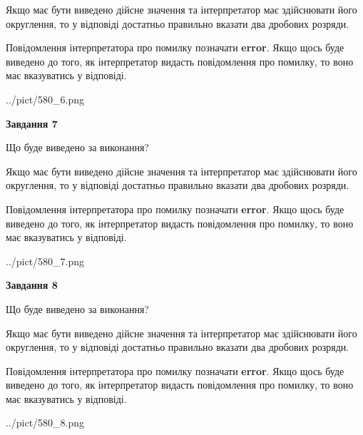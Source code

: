 \documentclass[12pt, ukrainian]{article}
\begin{document}
{\begin {Large}
Якщо має бути виведено дійсне значення та інтерпретатор має здійснювати його округлення, 
то у відповіді достатньо правильно вказати два дробових розряди.

Повідомлення інтерпретатора про помилку позначати \textbf{error}.
Якщо щось буде виведено до того, як інтерпретатор видасть повідомлення про помилку, 
то воно має вказуватись у відповіді. \par

\begin{center}
	{../pict/580_6.png}
\end{center}
\newpage

{\begin {center}\textbf{Завдання 7}\end {center}}\par
Що буде виведено за виконання? \par

Якщо має бути виведено дійсне значення та інтерпретатор має здійснювати його округлення, 
то у відповіді достатньо правильно вказати два дробових розряди.

Повідомлення інтерпретатора про помилку позначати \textbf{error}.
Якщо щось буде виведено до того, як інтерпретатор видасть повідомлення про помилку, 
то воно має вказуватись у відповіді. \par

\begin{center}
	{../pict/580_7.png}
\end{center}
\newpage

{\begin {center}\textbf{Завдання 8}\end {center}}\par
Що буде виведено за виконання? \par

Якщо має бути виведено дійсне значення та інтерпретатор має здійснювати його округлення, 
то у відповіді достатньо правильно вказати два дробових розряди.

Повідомлення інтерпретатора про помилку позначати \textbf{error}.
Якщо щось буде виведено до того, як інтерпретатор видасть повідомлення про помилку, 
то воно має вказуватись у відповіді. \par

\begin{center}
	{../pict/580_8.png}
\end{center}
\newpage


\end{Large}}
\end{document}
